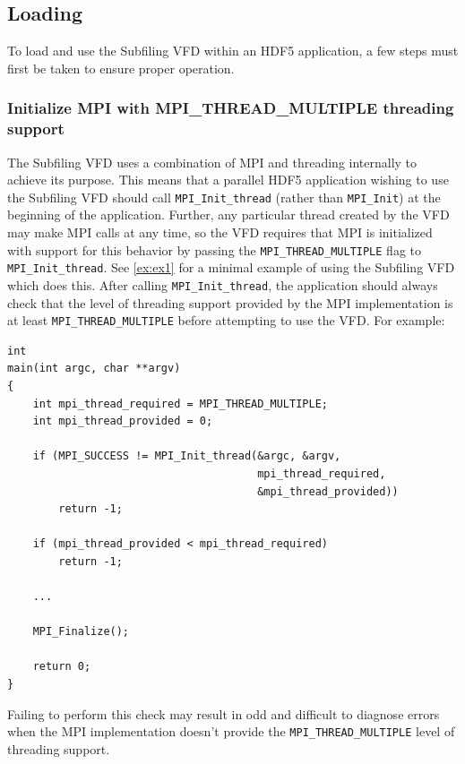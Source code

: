 \documentclass[../main.tex]{subfiles}
\begin{document}
\subsection{Loading}

To load and use the Subfiling VFD within an HDF5 application, a few steps must
first be taken to ensure proper operation.

\subsubsection{Initialize MPI with MPI\_THREAD\_MULTIPLE threading support}
\label{sec:req1}

The Subfiling VFD uses a combination of MPI and threading internally to achieve
its purpose. This means that a parallel HDF5 application wishing to use the
Subfiling VFD should call \texttt{MPI\_Init\_thread} (rather than \texttt{MPI\_Init})
at the beginning of the application. Further, any particular thread created by the
VFD may make MPI calls at any time, so the VFD requires that MPI is initialized
with support for this behavior by passing the \texttt{MPI\_THREAD\_MULTIPLE}
flag to \texttt{MPI\_Init\_thread}. See \ref{ex:ex1} for a minimal example of
using the Subfiling VFD which does this. After calling \texttt{MPI\_Init\_thread},
the application should always check that the level of threading support provided
by the MPI implementation is at least \texttt{MPI\_THREAD\_MULTIPLE} before
attempting to use the VFD. For example:

\begin{verbatim}
int
main(int argc, char **argv)
{
    int mpi_thread_required = MPI_THREAD_MULTIPLE;
    int mpi_thread_provided = 0;

    if (MPI_SUCCESS != MPI_Init_thread(&argc, &argv,
                                       mpi_thread_required,
                                       &mpi_thread_provided))
        return -1;

    if (mpi_thread_provided < mpi_thread_required)
        return -1;

    ...

    MPI_Finalize();

    return 0;
}
\end{verbatim}

Failing to perform this check may result in odd and difficult to diagnose errors
when the MPI implementation doesn't provide the \texttt{MPI\_THREAD\_MULTIPLE}
level of threading support.
\end{document}
